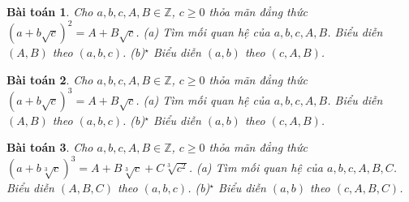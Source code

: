 \documentclass{article}
\newtheorem{baitoan}{Bài toán}
\begin{document}
\begin{baitoan}
	Cho $a,b,c,A,B\in\mathbb{Z}$, $c\ge0$ thỏa mãn đẳng thức $(a + b\sqrt{c})^2 = A + B\sqrt{c}$. (a) Tìm mối quan hệ của $a,b,c,A,B$. Biểu diễn $(A,B)$ theo $(a,b,c)$. (b)${}^\star$ Biểu diễn $(a,b)$ theo $(c,A,B)$.
\end{baitoan}

\begin{baitoan}
	Cho $a,b,c,A,B\in\mathbb{Z}$, $c\ge0$ thỏa mãn đẳng thức $(a + b\sqrt{c})^3 = A + B\sqrt{c}$. (a) Tìm mối quan hệ của $a,b,c,A,B$. Biểu diễn $(A,B)$ theo $(a,b,c)$. (b)${}^\star$ Biểu diễn $(a,b)$ theo $(c,A,B)$.
\end{baitoan}

\begin{baitoan}
	Cho $a,b,c,A,B\in\mathbb{Z}$, $c\ge0$ thỏa mãn đẳng thức $(a + b\sqrt[3]{c})^3 = A + B\sqrt[3]{c} + C\sqrt[3]{c^2}$. (a) Tìm mối quan hệ của $a,b,c,A,B,C$. Biểu diễn $(A,B,C)$ theo $(a,b,c)$. (b)${}^\star$ Biểu diễn $(a,b)$ theo $(c,A,B,C)$.
\end{baitoan}


\printbibliography[heading=bibintoc]
	
\end{document}

